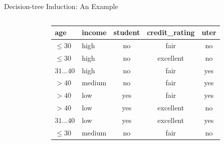 \documentclass[aspectratio=169,t,table]{beamer}
\begin{document}
{\begin{frame}{Decision-tree Induction: An Example}
\begin{columns}
\begin{column}{0.4\textwidth}
\begin{itemize}
          \end{itemize}
        \end{column}
        \begin{column}{0.6\textwidth}
          \begin{tabular}{|l|l|c|c|c|}
            \hline
            \cellcolor{blue!20}age & \cellcolor{blue!20}income & \cellcolor{blue!20}student & \cellcolor{blue!20}credit\_rating & \cellcolor{blue!20}uter \\\hline
            \cellcolor{yellow!20}$\leq 30$ & \cellcolor{yellow!20}high & \cellcolor{yellow!20}no & \cellcolor{yellow!20}fair & \cellcolor{red!20}no \\\hline
            \cellcolor{yellow!20}$\leq 30$ & \cellcolor{yellow!20}high & \cellcolor{yellow!20}no & \cellcolor{yellow!20}excellent & \cellcolor{red!20}no \\\hline
            \cellcolor{yellow!20}$31\ldots40$ & \cellcolor{yellow!20}high & \cellcolor{yellow!20}no & \cellcolor{yellow!20}fair & \cellcolor{green!20}yes \\\hline
            \cellcolor{yellow!20}$>40$ & \cellcolor{yellow!20}medium & \cellcolor{yellow!20}no & \cellcolor{yellow!20}fair & \cellcolor{green!20}yes \\\hline
            \cellcolor{yellow!20}$>40$ & \cellcolor{yellow!20}low & \cellcolor{yellow!20}yes & \cellcolor{yellow!20}fair & \cellcolor{green!20}yes \\\hline
            \cellcolor{yellow!20}$>40$ & \cellcolor{yellow!20}low & \cellcolor{yellow!20}yes & \cellcolor{yellow!20}excellent & \cellcolor{red!20}no \\\hline
            \cellcolor{yellow!20}$31\ldots40$ & \cellcolor{yellow!20}low & \cellcolor{yellow!20}yes & \cellcolor{yellow!20}excellent & \cellcolor{green!20}yes \\\hline
            \cellcolor{yellow!20}$\leq 30$ & \cellcolor{yellow!20}medium & \cellcolor{yellow!20}no & \cellcolor{yellow!20}fair & \cellcolor{red!20}no \\\hline

\end{tabular}
\end{column}
\end{columns}
\end{frame}}
\end{document}
